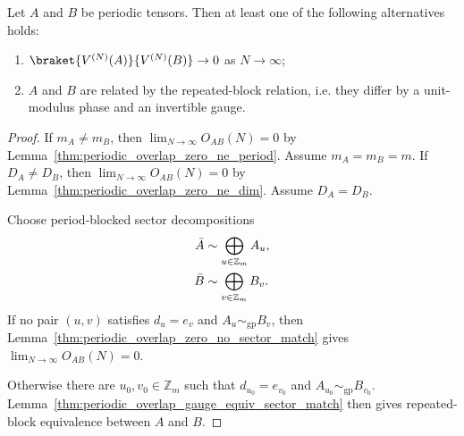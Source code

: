 \begin{lemma}\label{thm:periodic_overlap_dichotomy}
    \leanok
    Let $A$ and $B$ be periodic tensors. Then at least one of the following
    alternatives holds:
    \begin{enumerate}
        \item $\braket{V^{(N)}(A)}{V^{(N)}(B)} \to 0$ as $N\to\infty$;
        \item $A$ and $B$ are related by the repeated-block relation, i.e. they
              differ by a unit-modulus phase and an invertible gauge.
    \end{enumerate}
\end{lemma}
\begin{proof}\leanok
    If $m_A\ne m_B$, then
    $\lim_{N\to\infty}O_{AB}(N)=0$ by
    Lemma~\ref{thm:periodic_overlap_zero_ne_period}. Assume $m_A=m_B=m$.
    If $D_A\ne D_B$, then
    $\lim_{N\to\infty}O_{AB}(N)=0$ by
    Lemma~\ref{thm:periodic_overlap_zero_ne_dim}. Assume $D_A=D_B$.

    Choose period-blocked sector decompositions
    \begin{align}
        \bar A & \sim\bigoplus_{u\in\mathbb Z_m}A_u,
        \notag                                       \\
        \bar B & \sim\bigoplus_{v\in\mathbb Z_m}B_v.
        \notag
    \end{align}
    If no pair $(u,v)$ satisfies
    $d_u=e_v$ and $A_u\sim_{\mathrm{gp}}B_v$, then
    Lemma~\ref{thm:periodic_overlap_zero_no_sector_match} gives
    $\lim_{N\to\infty}O_{AB}(N)=0$.

    Otherwise there are $u_0,v_0\in\mathbb Z_m$ such that
    $d_{u_0}=e_{v_0}$ and
    $A_{u_0}\sim_{\mathrm{gp}}B_{v_0}$.
    Lemma~\ref{thm:periodic_overlap_gauge_equiv_sector_match} then gives
    repeated-block equivalence between $A$ and $B$.
\end{proof}

